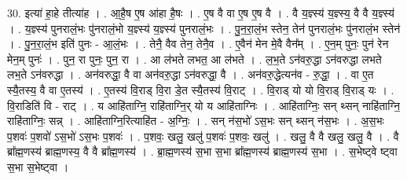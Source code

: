 \documentclass[17pt]{extarticle}
\begin{document}
30. इत्या॑ हा॒हे तीत्या॑ह । . आ॒है॒ष ए॒ष आ॑हा है॒षः । . ए॒ष वै वा ए॒ष ए॒ष वै । . वै य॒ज्ञ्स्य॑ य॒ज्ञ्स्य॒ वै वै य॒ज्ञ्स्य॑ । . य॒ज्ञ्स्य॑ पुनरालं॒भः पु॑नरालं॒भो य॒ज्ञ्स्य॑ य॒ज्ञ्स्य॑ पुनरालं॒भः । . पु॒न॒रा॒लं॒भ स्तेन॒ तेन॑ पुनरालं॒भः पु॑नरालं॒भ स्तेन॑ । . पु॒न॒रा॒लं॒भ इति॑ पुनः - आ॒लं॒भः । . तेनै॒ वैव तेन॒ तेनै॒व । . ए॒वैन॑ मेन मे॒वै वैन᳚म् । . ए॒न॒म् पुनः॒ पुन॑ रेन मेन॒म् पुनः॑ । . पुन॒ रा पुनः॒ पुन॒ रा । . आ ल॑भते लभत॒ आ ल॑भते । . ल॒भ॒ते ऽन॑वरु॒द्धा ऽन॑वरुद्धा लभते लभ॒ते ऽन॑वरुद्धा । . अन॑वरुद्धा॒ वै वा अन॑वरु॒द्धा ऽन॑वरुद्धा॒ वै । . अन॑वरु॒द्धेत्यन॑व - रु॒द्धा॒ । . वा ए॒त स्यै॒तस्य॒ वै वा ए॒तस्य॑ । . ए॒तस्य॑ वि॒राड् वि॒रा डे॒त स्यै॒तस्य॑ वि॒राट् । . वि॒राड् यो यो वि॒राड् वि॒राड् यः । . वि॒राडिति॑ वि - राट् । . य आहि॑ताग्नि॒ राहि॑ताग्नि॒र् यो य आहि॑ताग्निः । . आहि॑ताग्निः॒ सन् थ्सन् नाहि॑ताग्नि॒ राहि॑ताग्निः॒ सन्न् । . आहि॑ताग्नि॒रित्याहि॑त - अ॒ग्निः॒ । . सन् न॑स॒भो॑ ऽस॒भः सन् थ्सन् न॑स॒भः । . अ॒स॒भः प॒शवः॑ प॒शवो॑ ऽस॒भो॑ ऽस॒भः प॒शवः॑ । . प॒शवः॒ खलु॒ खलु॑ प॒शवः॑ प॒शवः॒ खलु॑ । . खलु॒ वै वै खलु॒ खलु॒ वै । . वै ब्रा᳚ह्म॒णस्य॑ ब्राह्म॒णस्य॒ वै वै ब्रा᳚ह्म॒णस्य॑ । . ब्रा॒ह्म॒णस्य॑ स॒भा स॒भा ब्रा᳚ह्म॒णस्य॑ ब्राह्म॒णस्य॑ स॒भा । . स॒भेष्ट्वे ष्ट्वा स॒भा स॒भेष्ट्वा । \newline
\end{document}
